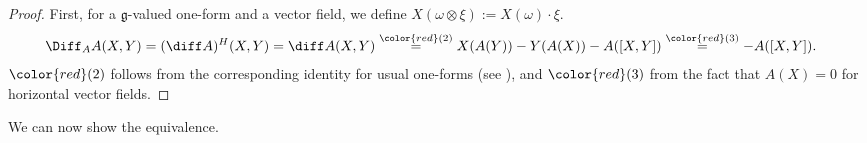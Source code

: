 \begin{proof}
    First, for a \(\mathfrak{g}\)-valued one-form and a vector field, we define \(X(\omega \otimes \xi):=X(\omega)\cdot \xi\). 
    \begin{align*}
    \Diff_A A(X,Y) & = (\diff A)^H(X,Y)=\diff A(X,Y) \overset{{\color{red}(2)}}{=}X(A(Y))-Y(A(X))-A([X,Y]) \overset{{\color{red}(3)}}{=}-A([X,Y]).
    \end{align*}
    \(\color{red}(2)\) follows from the corresponding identity for usual one-forms (see \parencite[Prop. 14.29]{lee_introSM}), and \(\color{red}(3)\) from the fact that \(A(X)=0\) for horizontal vector fields.
\end{proof}
We can now show the equivalence.
